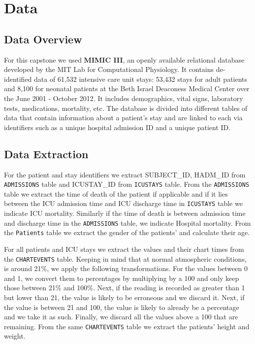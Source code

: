 
\chapter{Data} %

\label{Chapter2} %


\section{Data Overview}

For this capstone we used \textbf{MIMIC III}, an openly available relational database developed by the MIT Lab for Computational Physiology. It contains de-identified data of 61,532 intensive care unit stays: 53,432 stays for adult patients and 8,100 for neonatal patients at the Beth Israel Deaconess Medical Center over the June 2001 - October 2012. It includes demographics, vital signs, laboratory tests, medications, mortality, etc. The database is divided into different tables of data that contain information about a patient's stay and are linked to each via identifiers such as a unique hospital admission ID and a unique patient ID. 


\section{Data Extraction}

For the patient and stay identifiers we extract SUBJECT\_ID, HADM\_ID from \texttt{ADMISSIONS} table and ICUSTAY\_ID from \texttt{ICUSTAYS} table. From the \texttt{ADMISSIONS} table we extract the time of death of the patient if applicable and if it lies between the ICU admission time and ICU discharge time in \texttt{ICUSTAYS} table we indicate ICU mortality. Similarly if the time of death is between admission time and discharge time in the  \texttt{ADMISSIONS} table, we indicate Hospital mortality. From the \texttt{Patients} table we extract the gender of the patients' and calculate their age.   

For all patients and ICU stays we extract the \Fi values and their chart times from the \texttt{CHARTEVENTS} table. Keeping in mind that at normal atmospheric conditions, \Fi is around 21\%, we apply the following transformations. For the values between 0 and 1, we convert them to percentages by multiplying by a 100 and only keep those between 21\% and 100\%. Next, if the reading is recorded as greater than 1 but lower than 21,  the value is likely to be erroneous and we discard it. Next, if the value is between 21 and 100, the value is likely to already be a percentage and we take it as such. Finally, we discard all the values above a 100 that are remaining. From the same \texttt{CHARTEVENTS} table we extract the patients' height and weight. 

